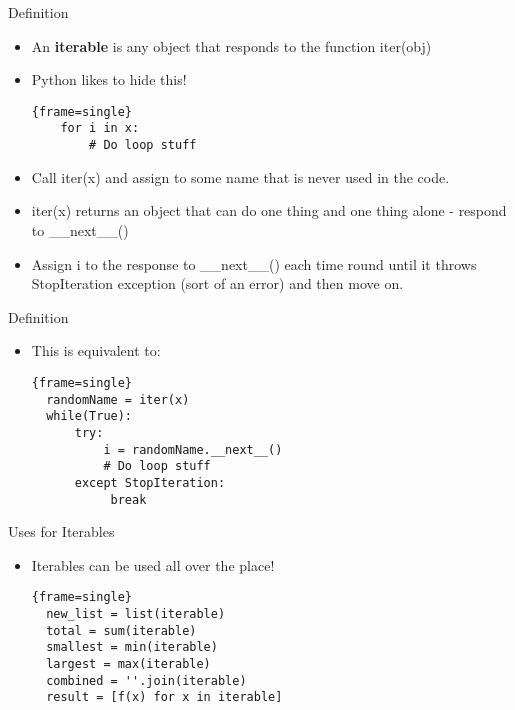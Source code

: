 \documentclass{beamer}
\begin{document}
\begin{frame}[fragile]{Definition}
  \begin{itemize}
	\item { An \textbf{iterable} is any object that responds to the function iter(obj) 
	}
	\pause
	\item{ Python likes to hide this! 
  \begin{block}{}
  \begin{lstlisting}{frame=single}
	for i in x: 
	    # Do loop stuff
  \end{lstlisting}
\end{block}
}
\item Call iter(x) and assign to some name that is never used in the code.
\pause
\item iter(x) returns an object that can do one thing and one thing alone - respond to \_\_next\_\_()
\pause
\item Assign i to the response to \_\_next\_\_() each time round until it throws StopIteration exception (sort of an error) and then move on.
\end{itemize}
\end{frame}
\begin{frame}[fragile]{Definition}
  \begin{itemize}
  \begin{block}{}
  \begin{lstlisting}{frame=single}
	for i in x: 
	    # Do loop stuff
  \end{lstlisting}
\end{block}
	\item{ This is equivalent to:
  \begin{block}{}
  \begin{lstlisting}{frame=single}
  randomName = iter(x)
  while(True):
      try:
          i = randomName.__next__()
          # Do loop stuff
      except StopIteration:
           break
  \end{lstlisting}
\end{block}
}
\end{itemize}
\end{frame}

\begin{frame}[fragile]{Uses for Iterables}
  \begin{itemize}
	\item{ Iterables can be used all over the place! 
  \begin{block}{}
  \begin{lstlisting}{frame=single}
  new_list = list(iterable)
  total = sum(iterable)
  smallest = min(iterable)
  largest = max(iterable)
  combined = ''.join(iterable)
  result = [f(x) for x in iterable]
 \end{lstlisting}
\end{block}
}

\end{itemize}
\end{frame}
\end{document}
